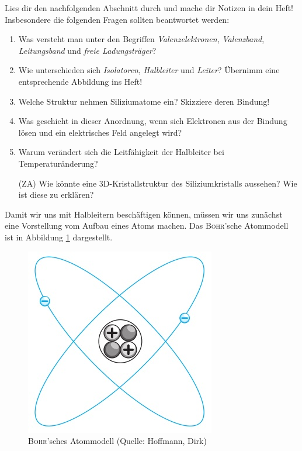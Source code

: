 \begin{Aufgabe}
Lies dir den nachfolgenden Abschnitt durch und mache dir Notizen in dein Heft!
Insbesondere die folgenden Fragen sollten beantwortet werden:
\begin{enumerate}
\item Was versteht man unter den Begriffen \emph{Valenzelektronen}, \emph{Valenzband}, \emph{Leitungsband} und \emph{freie Ladungsträger}?
\item Wie unterschieden sich \emph{Isolatoren}, \emph{Halbleiter} und \emph{Leiter}? Übernimm eine entsprechende Abbildung ins Heft!
\item Welche Struktur nehmen Siliziumatome ein? Skizziere deren Bindung!
\item Was geschieht in dieser Anordnung, wenn sich Elektronen aus der Bindung lösen und ein elektrisches Feld angelegt wird?
\item Warum verändert sich die Leitfähigkeit der Halbleiter bei Temperaturänderung?
\item[(ZA)] Wie könnte eine 3D-Kristallstruktur des Siliziumkristalls aussehen? Wie ist diese zu erklären?
\end{enumerate}
\end{Aufgabe}


Damit wir uns mit Halbleitern beschäftigen können, müssen wir uns zunächst eine Vorstellung vom Aufbau eines Atoms machen.
Das \textsc{Bohr}'sche Atommodell ist in Abbildung \ref{Abb:Atom} dargestellt.

\begin{figure}[htp]
\begin{center}
\includegraphics[scale=.8]{pics/Atom}
\caption{\textsc{Bohr}'sches Atommodell (Quelle: Hoffmann, Dirk)}
\label{Abb:Atom}
\end{center}
\end{figure}


